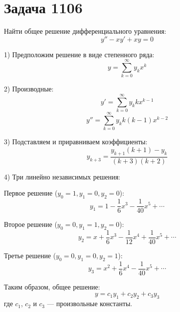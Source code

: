 \section*{Задача 1106}
Найти общее решение дифференциального уравнения:
$$y'' - xy' + xy = 0$$

\begin{solution}
1) Предположим решение в виде степенного ряда:
   $$y = \sum_{k = 0}^{\infty} y_k x^k$$

2) Производные:
   $$y' = \sum_{k = 0}^{\infty} y_k k x^{k-1}$$
   $$y'' = \sum_{k = 0}^{\infty} y_k k(k-1) x^{k-2}$$

3) Подставляем и приравниваем коэффициенты:
   $$y_{k+3} = \frac{y_{k+1}(k+1) - y_k}{(k+3)(k+2)}$$

4) Три линейно независимых решения:

   Первое решение ($y_0 = 1, y_1 = 0, y_2 = 0$):
   $$y_1 = 1 - \frac{1}{6}x^3 - \frac{1}{40}x^5 + \cdots$$

   Второе решение ($y_0 = 0, y_1 = 1, y_2 = 0$):
   $$y_2 = x + \frac{1}{6}x^3 - \frac{1}{12}x^4 + \frac{1}{40}x^5 + \cdots$$

   Третье решение ($y_0 = 0, y_1 = 0, y_2 = 1$):
   $$y_3 = x^2 + \frac{1}{6}x^4 - \frac{1}{40}x^5 + \cdots$$

Таким образом, общее решение:
$$y = c_1y_1 + c_2y_2 + c_3y_3$$
где $c_1$, $c_2$ и $c_3$ — произвольные константы.
\end{solution}

